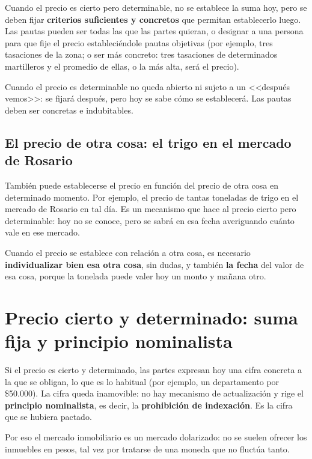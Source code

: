 \documentclass[12pt,oneside]{book}
\begin{document}
Cuando el precio es cierto pero determinable, no se establece la suma hoy, pero se deben fijar \textbf{criterios suficientes y concretos} que permitan establecerlo luego. Las pautas pueden ser todas las que las partes quieran, o designar a una persona para que fije el precio estableci\'endole pautas objetivas (por ejemplo, tres tasaciones de la zona; o ser m\'as concreto: tres tasaciones de determinados martilleros y el promedio de ellas, o la m\'as alta, ser\'a el precio).

\begin{important}
Cuando el precio es determinable no queda abierto ni sujeto a un <<despu\'es vemos>>: se fijar\'a despu\'es, pero hoy se sabe c\'omo se establecer\'a. Las pautas deben ser concretas e indubitables.
\end{important}

\subsection{El precio de otra cosa: el trigo en el mercado de Rosario}

Tambi\'en puede establecerse el precio en funci\'on del precio de otra cosa en determinado momento. Por ejemplo, el precio de tantas toneladas de trigo en el mercado de Rosario en tal d\'ia. Es un mecanismo que hace al precio cierto pero determinable: hoy no se conoce, pero se sabr\'a en esa fecha averiguando cu\'anto vale en ese mercado.

Cuando el precio se establece con relaci\'on a otra cosa, es necesario \textbf{individualizar bien esa otra cosa}, sin dudas, y tambi\'en \textbf{la fecha} del valor de esa cosa, porque la tonelada puede valer hoy un monto y ma\~nana otro.

\section{Precio cierto y determinado: suma fija y principio nominalista}

Si el precio es cierto y determinado, las partes expresan hoy una cifra concreta a la que se obligan, lo que es lo habitual (por ejemplo, un departamento por \$50.000). La cifra queda inamovible: no hay mecanismo de actualizaci\'on y rige el \textbf{principio nominalista}, es decir, la \textbf{prohibici\'on de indexaci\'on}. Es la cifra que se hubiera pactado.

Por eso el mercado inmobiliario es un mercado dolarizado: no se suelen ofrecer los inmuebles en pesos, tal vez por tratarse de una moneda que no fluct\'ua tanto.
\end{document}
